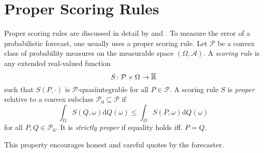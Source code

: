\section{Proper Scoring Rules}
\label{sec:proper-scoring-rules}

Proper scoring rules are discussed in detail by \Textcite{Gneiting2007} and \Textcite{Gneiting2014}.
To measure the error of a probabilistic forecast, one usually uses a 
proper scoring rule. 
Let \(\mathcal{P}\) be a convex class of probability measures on the 
measurable space \((\Omega, \mathcal{A})\).
A \textit{scoring rule} is any extended real-valued function 
\[ S\colon \mathcal{P} \times \Omega \rightarrow \overline{\mathbb{R}} \]
such that \(S(P, \cdot)\) is \(\mathcal{P}\)-quasiintegrable for all 
\(P\in \mathcal{P}\).
A scoring rule \(S\) is \textit{proper} relative to a convex subclass 
\(\mathcal{P}_0 \subseteq \mathcal{P}\) if
\[ \int_\Omega S(Q, \omega) \mathrm{d}Q(\omega) \leq \int_\Omega S(P, \omega) \mathrm{d}Q(\omega) \]
for all \(P, Q \in \mathcal{P}_0\). It is \textit{strictly proper} 
if equality holds iff. \(P = Q\).

This property encourages honest and careful quotes by the forecaster. 